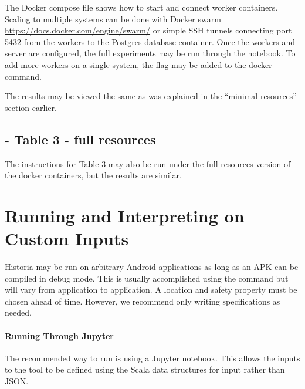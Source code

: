 \documentclass{acmart} %
\begin{document}
The Docker compose file  shows how to start and connect worker containers.  Scaling to multiple systems can be done with Docker swarm \url{https://docs.docker.com/engine/swarm/} or simple SSH tunnels connecting port 5432 from the workers to the Postgres database container. Once the workers and server are configured, the full experiments may be run through the  notebook.  To add more workers on a single system, the  flag may be added to the docker command.

The results may be viewed the same as was explained in the ``minimal resources'' section earlier.


\subsection{ - Table 3 - full resources}

The instructions for Table 3 may also be run under the full resources version of the docker containers, but the results are similar.

\iffalse
\section{Running and Interpreting \toolname on Custom Inputs}

Historia may be run on arbitrary Android applications as long as an APK can be compiled in debug mode.  This is usually accomplished using the command  but will vary from application to application. A location and safety property must be chosen ahead of time.  However, we recommend only writing \newls specifications as needed.

\paragraph{Running \toolname Through Jupyter}
The recommended way to run \toolname is using a Jupyter notebook.  This allows the inputs to the tool to be defined using the Scala data structures for input rather than JSON.





\end{document}
